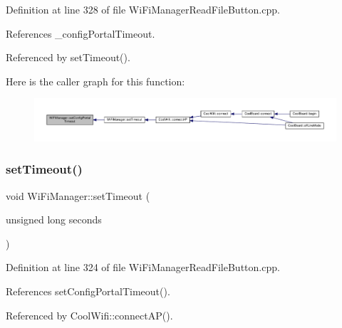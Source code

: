 Definition at line 328 of file Wi\+Fi\+Manager\+Read\+File\+Button.\+cpp.



References \+\_\+config\+Portal\+Timeout.



Referenced by set\+Timeout().

Here is the caller graph for this function\+:
\nopagebreak
\begin{figure}[H]
\begin{center}
\leavevmode
\includegraphics[width=350pt]{d4/dc8/class_wi_fi_manager_a904006cb4d2c769e93bfdef336853766_icgraph}
\end{center}
\end{figure}
\mbox{\label{class_wi_fi_manager_aa6493d59c284ff245edb767ff684756d}} 
\subsubsection{\texorpdfstring{set\+Timeout()}{setTimeout()}}
{\footnotesize\ttfamily void Wi\+Fi\+Manager\+::set\+Timeout (\begin{DoxyParamCaption}\item[{unsigned long}]{seconds }\end{DoxyParamCaption})}



Definition at line 324 of file Wi\+Fi\+Manager\+Read\+File\+Button.\+cpp.



References set\+Config\+Portal\+Timeout().



Referenced by Cool\+Wifi\+::connect\+A\+P().

